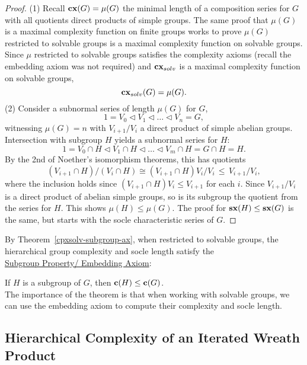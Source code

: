 \documentclass[a4paper,11pt]{amsart}
\theoremstyle{definition}
\newcommand{\cx}{\mbox{\bf cx}}
\renewcommand{\c}{\mbox{\bf c}}
\newcommand{\sx}{{\bf sx}}
\newcommand{\cxsolv}{\cx_{solv}}
\newcommand{\1}{{\mathbf 1}}
\begin{document}
\begin{proof}  
(1) Recall $\cx(G)=\mu(G)$  the minimal length of a composition series for $G$ with all quotients direct products of simple groups.
The same proof that $\mu(G)$ is a maximal complexity function on finite groups works to prove $\mu(G)$ restricted to solvable groups
is a maximal complexity function on solvable groups.
Since $\mu$ restricted to solvable groups satisfies the complexity axioms (recall the embedding axiom was not required) and $\cxsolv$ is a maximal complexity function on solvable groups,  
$$\cxsolv(G) = \mu(G).$$  
(2) Consider a subnormal series of length $\mu(G)$ for $G$,
$$1 = V_0 \lhd V_1 \lhd \ldots \lhd V_n = G,$$
witnessing $\mu(G)=n$ with $V_{i+1}/V_i$ a direct product of simple abelian groups.
Intersection with subgroup $H$ yields a subnormal series for $H$:
$$1 = V_0 \cap H \lhd V_1 \cap H  \lhd \ldots \lhd V_m \cap H = G \cap H =H.$$
By the 2nd of Noether's isomorphism theorems, this  has quotients 
$$(V_{i+1} \cap H)/(V_i \cap H) \cong  (V_{i+1}\cap H)V_i/V_i \,
\leq \,V_{i+1}/V_i,$$
where the inclusion holds since $(V_{i+1}\cap H)V_i \leq V_{i+1}$  for each $i.$
Since $V_{i+1}/V_i$ is a direct product of abelian simple groups,  so is its subgroup the quotient from the series for $H$.   This shows $\mu(H)\leq \mu(G)$.
The proof for $\sx(H)\leq \sx(G)$ is the same, but starts with the socle characteristic series of $G$. 
\end{proof}



By  Theorem~\ref{cpxsolv-subgroup-ax}, when restricted  to solvable groups, the hierarchical group complexity and socle length satisfy the \\

\underline{Subgroup Property/ Embedding Axiom}: 

If $H$ is a subgroup of $G$, then $\c(H)\leq \c (G)$.\\

\noindent
The importance of the theorem is that when working with solvable groups, we can use the embedding axiom to compute their complexity and socle length. 










\subsection{Hierarchical Complexity of an Iterated Wreath Product}
\end{document}
